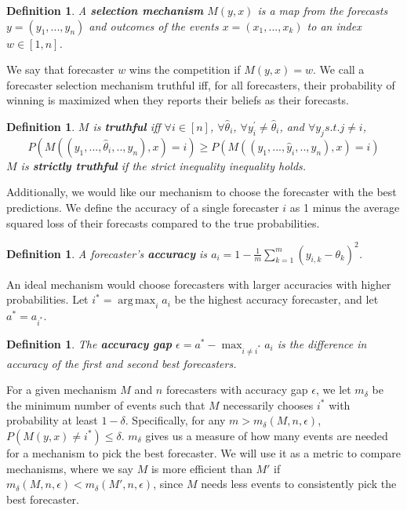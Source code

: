 \documentclass[letterpaper,12pt]{article}
\DeclareMathOperator*{\argmax}{arg\,max}
\newcommand{\1}{\mathbbm{1}}
\newtheorem{definition}[theorem]{Definition}
\begin{document}
\begin{definition}
  \label{mechanism}
  A \textbf{selection mechanism} $M(y, x)$ is a map from the forecasts $y = (y_1, ..., y_n)$ and outcomes of the events $x = (x_1, ..., x_k)$ to an index $w \in [1, n]$.
\end{definition}
We say that forecaster $w$ wins the competition if $M(y, x) = w$. We call a forecaster selection mechanism truthful iff, for all forecasters, their probability of winning is maximized when they reports their beliefs as their forecasts.

\begin{definition}
  \label{truthfullness}
  $M$ is \textbf{truthful} iff $\forall i \in [n]$, $\forall \hat{\theta}_i$, $\forall y^{\prime}_i \neq \hat{\theta}_i$, and $\forall y_j s.t. j \neq i$,
\[ P(M( (y_1, ..., \hat \theta_i, .., y_n), x ) = i) \geq  P(M( (y_1, ..., \hat y_i, .., y_n), x ) = i)\]
$M$ is \textbf{strictly truthful} if the strict inequality inequality holds.
\end{definition}

Additionally, we would like our mechanism to choose the forecaster with the best predictions. We define the accuracy of a single forecaster $i$ as 1 minus the average squared loss of their forecasts compared to the true probabilities.

\begin{definition}
  \label{accuracy}
  A forecaster's \textbf{accuracy} is $a_i = 1 - \frac{1}{m}\sum_{k=1}^m (y_{i, k} - \theta_k)^2$.
\end{definition}
An ideal mechanism would choose forecasters with larger accuracies with higher probabilities. Let $i^* = \argmax_i a_i$ be the highest accuracy forecaster, and let $a^* = a_{i^*}$.

\begin{definition}
  \label{accuracy_gap}
  The \textbf{accuracy gap} $\epsilon = a^* - \max_{i \neq i^*} a_i$ is the difference in accuracy of the first and second best forecasters.
\end{definition}

For a given mechanism $M$ and $n$ forecasters with accuracy gap $\epsilon$, we let $m_\delta$ be the minimum number of events such that $M$ necessarily chooses $i^*$ with probability at least $1 - \delta$. Specifically, for any $m > m_\delta(M, n, \epsilon)$, $P(M(y, x) \neq i^*) \leq \delta$. $m_\delta$ gives us a measure of how many events are needed for a mechanism to pick the best forecaster. We will use it as a metric to compare mechanisms, where we say $M$ is more efficient than $M'$ if $m_\delta(M, n, \epsilon) < m_\delta(M', n, \epsilon)$, since $M$ needs less events to consistently pick the best forecaster.
\end{document}
